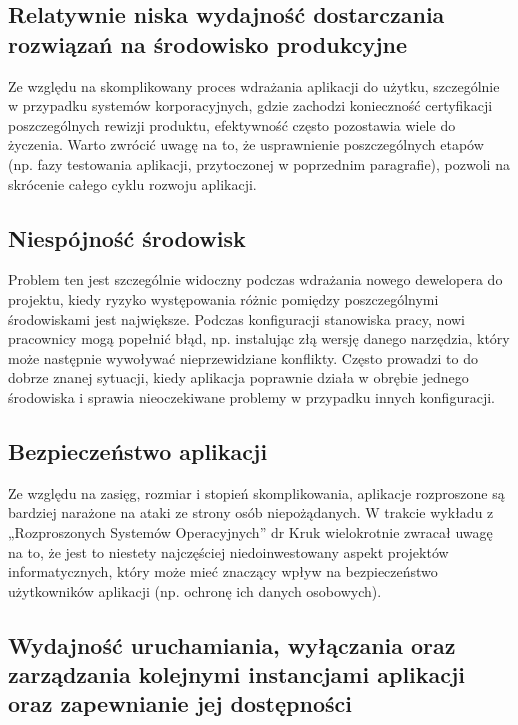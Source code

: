 \subsection{Relatywnie niska wydajność dostarczania rozwiązań na środowisko produkcyjne}

Ze względu na skomplikowany proces wdrażania aplikacji do użytku, szczególnie w przypadku systemów korporacyjnych, gdzie zachodzi konieczność certyfikacji poszczególnych rewizji produktu, efektywność często pozostawia wiele do życzenia. Warto zwrócić uwagę na to, że usprawnienie poszczególnych etapów (np. fazy testowania aplikacji, przytoczonej w poprzednim paragrafie), pozwoli na skrócenie całego cyklu rozwoju aplikacji.

\subsection{Niespójność środowisk}

Problem ten jest szczególnie widoczny podczas wdrażania nowego dewelopera do projektu, kiedy ryzyko występowania różnic pomiędzy poszczególnymi środowiskami jest największe. Podczas konfiguracji stanowiska pracy, nowi pracownicy mogą popełnić błąd, np. instalując złą wersję danego narzędzia, który może następnie wywoływać nieprzewidziane konflikty. Często prowadzi to do dobrze znanej sytuacji, kiedy aplikacja poprawnie działa w obrębie jednego środowiska i sprawia nieoczekiwane problemy w przypadku innych konfiguracji.

\subsection{Bezpieczeństwo aplikacji}

 Ze względu na zasięg, rozmiar i stopień skomplikowania, aplikacje rozproszone są bardziej narażone na ataki ze strony osób niepożądanych. W trakcie wykładu z „Rozproszonych Systemów Operacyjnych” dr Kruk wielokrotnie zwracał uwagę na to, że jest to niestety najczęściej niedoinwestowany aspekt projektów informatycznych, który może mieć znaczący wpływ na bezpieczeństwo użytkowników aplikacji (np. ochronę ich danych osobowych).

 \subsection{Wydajność uruchamiania, wyłączania oraz zarządzania kolejnymi instancjami aplikacji oraz zapewnianie jej dostępności}

